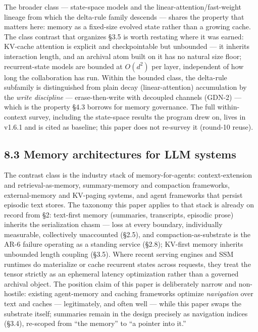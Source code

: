 \documentclass[11pt]{article}
\begin{document}
The broader class --- state-space models and the linear-attention/fast-weight lineage from which the delta-rule family descends --- shares the property that matters here: memory as a fixed-size evolved state rather than a growing cache. The class contrast that organizes \S{}3.5 is worth restating where it was earned: KV-cache attention is explicit and checkpointable but unbounded --- it inherits interaction length, and an archival atom built on it has no natural size floor; recurrent-state models are bounded at \(O(d^{2})\) per layer, independent of how long the collaboration has run. Within the bounded class, the delta-rule subfamily is distinguished from plain decay (linear-attention) accumulation by the \emph{write discipline} --- erase-then-write with decoupled channels (GDN-2) --- which is the property \S{}4.3 borrows for memory governance. The full within-context survey, including the state-space results the program drew on, lives in v1.6.1 and is cited as baseline; this paper does not re-survey it (round-10 reuse).

\subsection{8.3 Memory architectures for LLM systems}\label{memory-architectures-for-llm-systems}

The contrast class is the industry stack of memory-for-agents: context-extension and retrieval-as-memory, summary-memory and compaction frameworks, external-memory and KV-paging systems, and agent frameworks that persist episodic text stores. The taxonomy this paper applies to that stack is already on record from \S{}2: text-first memory (summaries, transcripts, episodic prose) inherits the serialization chasm --- loss at every boundary, individually measurable, collectively unaccounted (\S{}2.5), and compaction-as-substrate is the AR-6 failure operating as a standing service (\S{}2.8); KV-first memory inherits unbounded length coupling (\S{}3.5). Where recent serving engines and SSM runtimes do materialize or cache recurrent states across requests, they treat the tensor strictly as an ephemeral latency optimization rather than a governed archival object. The position claim of this paper is deliberately narrow and non-hostile: existing agent-memory and caching frameworks optimize \emph{navigation} over text and caches --- legitimately, and often well --- while this paper swaps the substrate itself; summaries remain in the design precisely as navigation indices (\S{}3.4), re-scoped from ``the memory'' to ``a pointer into it.''
\end{document}
